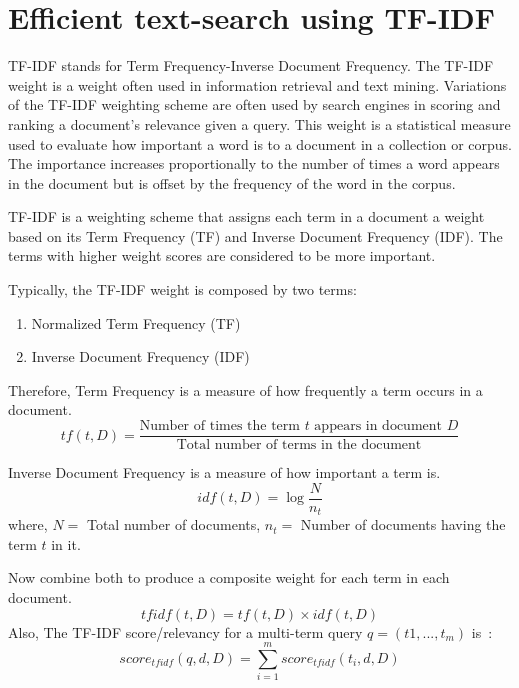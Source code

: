 \section{Efficient text-search using TF-IDF}

TF-IDF stands for Term Frequency-Inverse Document Frequency. 
The TF-IDF weight is a weight often used in information 
retrieval and text mining. Variations of the TF-IDF weighting 
scheme are often used by search engines in scoring and ranking 
a document’s relevance given a query. 
This weight is a statistical measure used to evaluate how 
important a word is to a document in a collection or corpus. 
The importance increases proportionally to the number of times 
a word appears in the document but is offset by the frequency 
of the word in the corpus.

TF-IDF is a weighting scheme that assigns each term in a 
document a weight based on its Term Frequency (TF) and 
Inverse Document Frequency (IDF). The terms with higher 
weight scores are considered to be more important.

Typically, the TF-IDF weight is composed by two terms:
\begin{enumerate}
    \item Normalized Term Frequency (TF)
    \item Inverse Document Frequency (IDF)
\end{enumerate}

Therefore, Term Frequency is a measure of how frequently a 
term occurs in a document.
\begin{equation}
    tf(t, D) = \frac{\text{Number of times the term } t \text{ appears in document } D}{\text{Total number of terms in the document}}
    \label{eqn:tf}
\end{equation}

Inverse Document Frequency is a measure of how important a term is.~\cite{tfidftutorial}
\begin{equation}
    idf(t, D) = \log \frac{N}{n _t}
    \label{eqn:idf}
\end{equation}
where, $N =$ Total number of documents, $n _t =$ Number of documents having the term $t$ in it.

Now combine both to produce a composite weight for each term in each document.
\begin{equation}
    tfidf(t,D) = tf(t,D) \times idf(t,D)
    \label{eqn:tfidf}
\end{equation}
Also, The TF-IDF score/relevancy for a multi-term query $q = (t 1 , . . . , t_m)$ is~\cite{tfidfFormulae}:
\begin{equation}
    score _{tfidf}(q, d, D) = \sum^{m}_{i = 1} score _{tfidf}(t _i, d, D)
    \label{eqn:score}
\end{equation}

